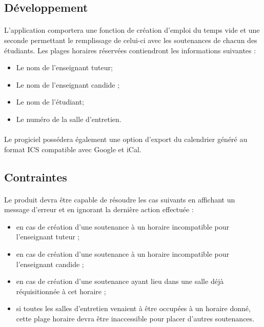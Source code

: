 \documentclass[a4paper,10pt]{report}
\begin{document}
      \subsection{Développement}
	
	\paragraph{}
	L’application comportera une fonction de création d’emploi du temps vide et une seconde permettant le remplissage de celui-ci avec les soutenances de chacun des étudiants.
	Les plages horaires réservées contiendront les informations suivantes :
	\renewcommand\labelitemi{\textbullet}
	\begin{itemize}
	  \item Le nom de l’enseignant tuteur;
	  \item Le nom de l’enseignant candide ;
	  \item Le nom de l’étudiant;
	  \item Le numéro de la salle d’entretien.
	\end{itemize}
	
	\paragraph{}
	Le progiciel possédera également une option d’export du calendrier généré au format ICS compatible avec Google et iCal.
	
      \subsection{Contraintes}
	\paragraph{}

	Le produit devra être capable de résoudre les cas suivants en affichant un message d’erreur et en ignorant la dernière action effectuée :
	\newline
	\renewcommand\labelitemi{\textbullet}
	\begin{itemize}
	  \item en cas de création d'une soutenance à un horaire incompatible pour l'enseignant tuteur ;
	  \item en cas de création d'une soutenance à un horaire incompatible pour l'enseignant candide ;
	  \item en cas de création d'une soutenance ayant lieu dans une salle déjà réquisitionnée à cet horaire ;
	  \item si toutes les salles d’entretien venaient à être occupées à un horaire donné, cette plage horaire devra être inaccessible pour placer d’autres soutenances.
	\end{itemize}
  
\end{document}

